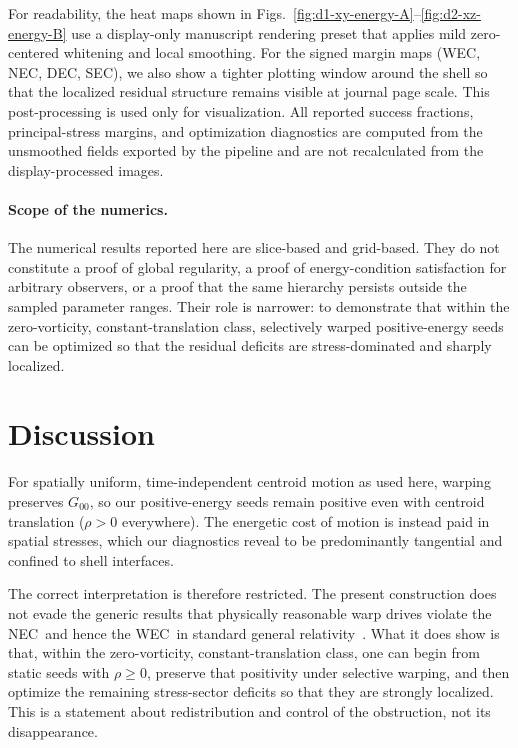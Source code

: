 \documentclass[11pt]{article}
\makeatletter
\newcommand{\@abbr}[1]{\ifmmode\mathrm{#1}\else\textsc{#1}\fi}
\newcommand{\WEC}{\@abbr{WEC}}
\newcommand{\NEC}{\@abbr{NEC}}
\makeatother
\begin{document}
For readability, the heat maps shown in Figs.~\ref{fig:d1-xy-energy-A}--\ref{fig:d2-xz-energy-B} use a display-only manuscript rendering preset that applies mild zero-centered whitening and local smoothing. For the signed margin maps (WEC, NEC, DEC, SEC), we also show a tighter plotting window around the shell so that the localized residual structure remains visible at journal page scale. This post-processing is used only for visualization. All reported success fractions, principal-stress margins, and optimization diagnostics are computed from the unsmoothed fields exported by the pipeline and are not recalculated from the display-processed images.

\paragraph{Scope of the numerics.}
The numerical results reported here are slice-based and grid-based. They do not constitute a proof of global regularity, a proof of energy-condition satisfaction for arbitrary observers, or a proof that the same hierarchy persists outside the sampled parameter ranges. Their role is narrower: to demonstrate that within the zero-vorticity, constant-translation class, selectively warped positive-energy seeds can be optimized so that the residual deficits are stress-dominated and sharply localized.

\section{Discussion}
\label{sec:implications}
For spatially uniform, time-independent centroid motion as used here, warping preserves $G_{00}$, so our positive-energy seeds remain positive even with centroid translation ($\rho > 0$ everywhere). The energetic cost of motion is instead paid in spatial stresses, which our diagnostics reveal to be predominantly tangential and confined to shell interfaces.

The correct interpretation is therefore restricted. The present construction does not evade the generic results that physically reasonable warp drives violate the \NEC\ and hence the \WEC\ in standard general relativity~\cite{Olum:1998mu,Santiago:2021aup}. What it does show is that, within the zero-vorticity, constant-translation class, one can begin from static seeds with $\rho\ge 0$, preserve that positivity under selective warping, and then optimize the remaining stress-sector deficits so that they are strongly localized. This is a statement about redistribution and control of the obstruction, not its disappearance.
\end{document}
